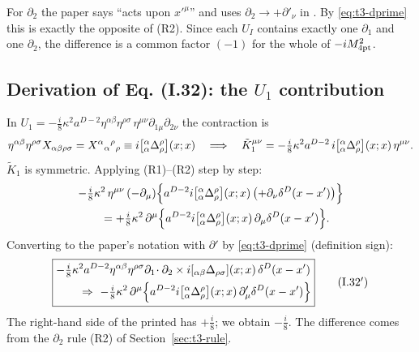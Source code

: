 \begin{notebox}
For \(\partial_2\) the paper says ``acts upon \(x'^\mu\)'' and uses \(\partial_2\to+\partial'_\nu\)
in . By \eqref{eq:t3-dprime} this is exactly the opposite of (R2). Since each
\(U_I\) contains exactly one \(\partial_1\) and one \(\partial_2\), the difference is a common
factor \((-1)\) for the whole of \(-iM^2_{\rm 4pt}\).
\end{notebox}

\subsection{Derivation of Eq. (I.32): the \texorpdfstring{$U_1$}{U1} contribution}
In \(U_1=-\tfrac i8\kappa^2a^{D-2}\eta^{\alpha\beta}\eta^{\rho\sigma}\,\eta^{\mu\nu}\partial_{1\mu}\partial_{2\nu}\)
the contraction is
\begin{equation}\label{eq:t3-K1}
\eta^{\alpha\beta}\eta^{\rho\sigma}X_{\alpha\beta\rho\sigma}=X^\alpha{}_\alpha{}^\rho{}_\rho\equiv i\bigl[{}^\alpha_\alpha\Delta^\rho_\rho\bigr](x;x)
\quad\Longrightarrow\quad
\tilde K_1^{\mu\nu}=-\tfrac i8\kappa^2a^{D-2}\,i\bigl[{}^\alpha_\alpha\Delta^\rho_\rho\bigr](x;x)\,\eta^{\mu\nu}.
\end{equation}
\(\tilde K_1\) is symmetric. Applying (R1)--(R2) step by step:
\begin{equation*}
\begin{aligned}
\relax&{-}\tfrac i8\kappa^2\,\eta^{\mu\nu}\,(-\partial_\mu)\Bigl\{a^{D-2}i\bigl[{}^\alpha_\alpha\Delta^\rho_\rho\bigr](x;x)\,\bigl(+\partial_\nu\delta^D(x-x')\bigr)\Bigr\}\\
&\qquad=+\tfrac i8\kappa^2\,\partial^\mu\Bigl\{a^{D-2}i\bigl[{}^\alpha_\alpha\Delta^\rho_\rho\bigr](x;x)\,\partial_\mu\delta^D(x-x')\Bigr\}.
\end{aligned}
\end{equation*}
Converting to the paper's notation with \(\partial'\) by \eqref{eq:t3-dprime}
(definition sign):
\begin{equation*}\label{eq:t3-I32}
\boxed{\begin{aligned}\relax&{-}\tfrac i8\kappa^2a^{D-2}\eta^{\alpha\beta}\eta^{\rho\sigma}\partial_1\!\cdot\partial_2\times i[{}_{\alpha\beta}\Delta_{\rho\sigma}](x;x)\,\delta^D(x-x')\\
&\qquad\Rightarrow\ -\tfrac i8\kappa^2\,\partial^\mu\Bigl\{a^{D-2}i\bigl[{}^\alpha_\alpha\Delta^\rho_\rho\bigr](x;x)\,\partial'_\mu\delta^D(x-x')\Bigr\}\end{aligned}}
\tag{I.32$'$}
\end{equation*}
The right-hand side of the printed  has \(+\tfrac i8\); we obtain
\(-\tfrac i8\). The difference comes from the \(\partial_2\) rule (R2) of
Section~\ref{sec:t3-rule}.

